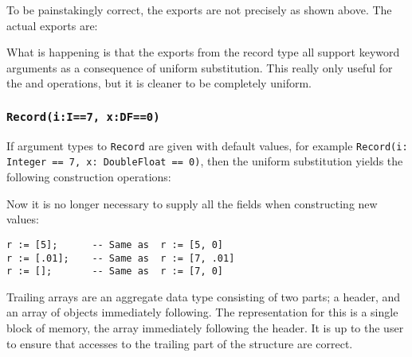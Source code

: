 To be painstakingly correct, the exports are not precisely as shown above.
The actual exports are:


What is happening is that the exports from the record type
all support keyword arguments as  a consequence of uniform substitution.
This really only useful for the  and 
operations, but it is cleaner to be completely uniform.

\subsubsection{{\tt Record(i:I==7, x:DF==0)}}

If argument types to \verb"Record" are given with default values,
for example
\verb"Record(i: Integer == 7, x: DoubleFloat == 0)",
then the uniform substitution yields the following construction operations:


Now it is no longer necessary to supply all the fields when constructing
new values:

\begin{small}%
\begin{verbatim}
r := [5];      -- Same as  r := [5, 0]
r := [.01];    -- Same as  r := [7, .01]
r := [];       -- Same as  r := [7, 0]
\end{verbatim}
\end{small}

%
%
%

Trailing arrays are an aggregate data type consisting of two parts; a header,
and an array of objects immediately following.  The representation for this is a
single block of memory,  the array immediately following the header.  It
is up to the user to ensure that accesses to the trailing part of the structure
are correct.

